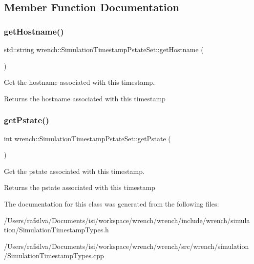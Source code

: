 \subsection{Member Function Documentation}
\mbox{\label{classwrench_1_1_simulation_timestamp_pstate_set_a255103b3ace42f65ca27d34ce9b02bdb}} 
\subsubsection{\texorpdfstring{get\+Hostname()}{getHostname()}}
{\footnotesize\ttfamily std\+::string wrench\+::\+Simulation\+Timestamp\+Pstate\+Set\+::get\+Hostname (\begin{DoxyParamCaption}{ }\end{DoxyParamCaption})}



Get the hostname associated with this timestamp. 

\begin{DoxyReturn}{Returns}
the hostname associated with this timestamp 
\end{DoxyReturn}
\mbox{\label{classwrench_1_1_simulation_timestamp_pstate_set_aa16b326fe7c60ec75ed6468d94183c0d}} 
\subsubsection{\texorpdfstring{get\+Pstate()}{getPstate()}}
{\footnotesize\ttfamily int wrench\+::\+Simulation\+Timestamp\+Pstate\+Set\+::get\+Pstate (\begin{DoxyParamCaption}{ }\end{DoxyParamCaption})}



Get the pstate associated with this timestamp. 

\begin{DoxyReturn}{Returns}
the pstate associated with this timestamp 
\end{DoxyReturn}


The documentation for this class was generated from the following files\+:\begin{DoxyCompactItemize}
\item 
/\+Users/rafsilva/\+Documents/isi/workspace/wrench/wrench/include/wrench/simulation/Simulation\+Timestamp\+Types.\+h\item 
/\+Users/rafsilva/\+Documents/isi/workspace/wrench/wrench/src/wrench/simulation/Simulation\+Timestamp\+Types.\+cpp\end{DoxyCompactItemize}
